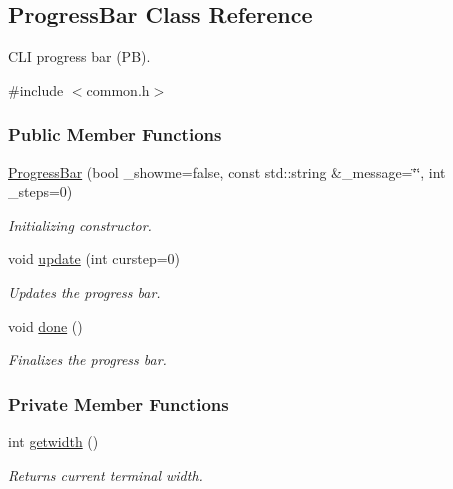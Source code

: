 \hypertarget{classProgressBar}{
\subsection{ProgressBar Class Reference}
\label{classProgressBar}
}


CLI progress bar (PB).  




{\ttfamily \#include $<$common.h$>$}

\subsubsection*{Public Member Functions}
\begin{DoxyCompactItemize}
\item 
\hyperlink{classProgressBar_a72c9acca2624b5701f1326d990bb6187}{ProgressBar} (bool \_\-showme=false, const std::string \&\_\-message=\char`\"{}\char`\"{}, int \_\-steps=0)
\begin{DoxyCompactList}\small\item\em Initializing constructor. \item\end{DoxyCompactList}\item 
void \hyperlink{classProgressBar_a8206a039bb2710736a2ef4ee849206c9}{update} (int curstep=0)
\begin{DoxyCompactList}\small\item\em Updates the progress bar. \item\end{DoxyCompactList}\item 
void \hyperlink{classProgressBar_acdd64fd71db1d6978b6e6e88b9d7c62b}{done} ()
\begin{DoxyCompactList}\small\item\em Finalizes the progress bar. \item\end{DoxyCompactList}\end{DoxyCompactItemize}
\subsubsection*{Private Member Functions}
\begin{DoxyCompactItemize}
\item 
int \hyperlink{classProgressBar_aad18499fd092b7082f48b3dbdb33d2b4}{getwidth} ()
\begin{DoxyCompactList}\small\item\em Returns current terminal width. \item\end{DoxyCompactList}\end{DoxyCompactItemize}
